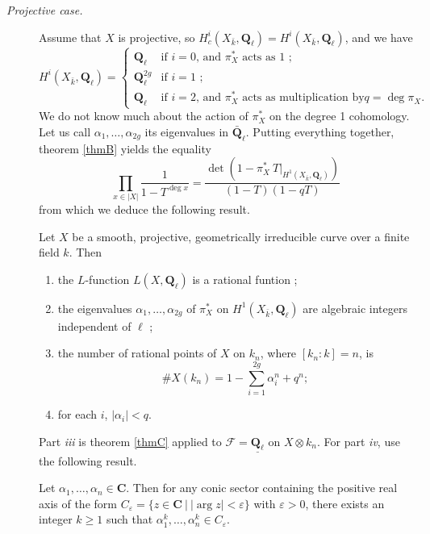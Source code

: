 \begin{description}
\item[\it Projective case.]
Assume that $X$ is projective, so $H_c^i(X_{\bar k}, \mathbf{Q}_\ell) =
H^i(X_{\bar k}, \mathbf{Q}_\ell)$, and we have
$$
H^i(X_{\bar k}, \mathbf{Q}_\ell) =
\left\{
\begin{matrix}
\mathbf{Q}_\ell & \text{if $i = 0$, and $\pi_X^*$ acts as 1 ;} \\
\mathbf{Q}_\ell^{2g} & \text{if $i = 1$ ;} \\
\mathbf{Q}_\ell & \text{if $i = 2$, and $\pi_X^*$ acts as multiplication by
$q=\deg \pi_X$.}
\end{matrix}
\right.
$$
We do not know much about the action of $\pi_X^*$ on the degree 1 cohomology.
Let us call $\alpha_1, \ldots, \alpha_{2g}$ its eigenvalues in
$\bar{\mathbf{Q}}_\ell$. Putting everything together, theorem \ref{thmB} yields
the equality
$$
\prod_{x\in |X|} \frac{1}{1-T^{\deg x}} = \frac{\det\left(1- \pi_X^*\
T\big|_{H^1(X_{\bar k}, \mathbf{Q}_\ell)}\right)}{(1-T)(1-qT)}
$$
from which we deduce the following result.

\begin{lemma}
Let $X$ be a smooth, projective, geometrically irreducible curve over a finite
field $k$. Then
\begin{enumerate}
\item the $L$-function $L(X, \mathbf{Q}_\ell)$ is a rational funtion ;
\item the eigenvalues $\alpha_1, \ldots, \alpha_{2g}$ of $\pi_X^*$ on
$H^1(X_{\bar k}, \mathbf{Q}_\ell)$ are algebraic integers independent of $\ell$
;
\item the number of rational points of $X$ on $k_n$, where $[k_n: k] = n$, is
$$
\# X(k_n) = 1-\sum_{i=1}^{2g}\alpha_i^n +q^n ;
$$
\item
for each $i$, $|\alpha_i| < q$.
\end{enumerate}
\end{lemma}	

Part {\it iii} is theorem \ref{thmC} applied to $\mathcal{F} =
\underline{\mathbf{Q}_\ell}$ on $X\otimes k_n$. For part {\it iv}, use the
following result.
\begin{exercise}
Let $\alpha_1, \dots, \alpha_n \in \mathbf{C}$. Then for any conic sector
containing the positive real axis of the form $C_\varepsilon = \{ z \in
\mathbf{C} \ | \ |\arg z| < \varepsilon \}$ with $\varepsilon >0$, there exists
an integer $k \geq 1$ such that $\alpha_1^k, \dots, \alpha_n^k \in
C_\varepsilon$.
\end{exercise}


\end{description}
